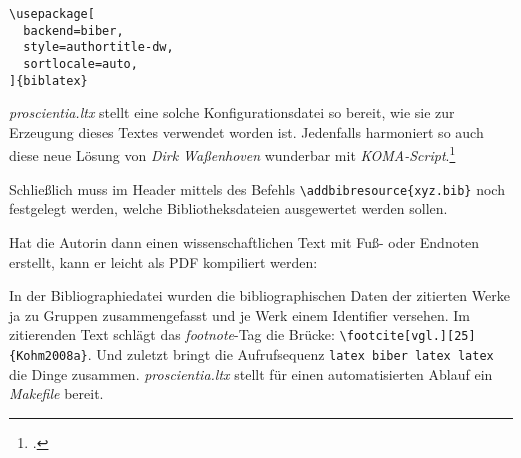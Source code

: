\small
\begin{verbatim}
\usepackage[
  backend=biber,
  style=authortitle-dw,
  sortlocale=auto,
]{biblatex}

\end{verbatim}
\small

\emph{proscientia.ltx} stellt eine solche Konfigurationsdatei so bereit, wie sie zur Erzeugung dieses Textes verwendet worden ist. Jedenfalls harmoniert so auch diese neue Lösung von \emph{Dirk Waßenhoven} wunderbar mit
\emph{KOMA-Script}.\footcite[vgl.][]{Kohm2008a}

Schließlich muss im Header mittels des Befehls \texttt{\textbackslash{}addbibresource\{xyz.bib\}} noch festgelegt werden, welche Bibliotheksdateien ausgewertet werden sollen.

Hat die Autorin dann einen wissenschaftlichen Text mit Fuß- oder Endnoten erstellt, kann er leicht als PDF kompiliert werden:

In der Bibliographiedatei wurden die bibliographischen Daten der zitierten Werke ja zu Gruppen zusammengefasst und je Werk einem Identifier versehen. Im zitierenden Text schlägt das \emph{footnote}-Tag die Brücke: \texttt{\textbackslash{}footcite[vgl.][25]\{Kohm2008a\}}. Und zuletzt bringt die Aufrufsequenz \texttt{latex biber latex latex} die Dinge zusammen. \emph{proscientia.ltx} stellt für einen automatisierten Ablauf ein \emph{Makefile} bereit.
